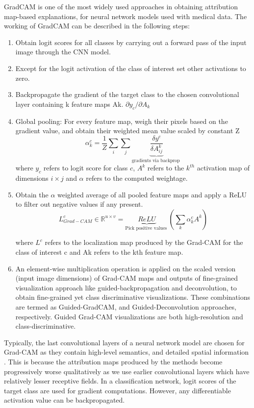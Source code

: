 \documentclass[../report.tex]{subfiles}
\begin{document}
GradCAM is one of the most widely used approaches in obtaining attribution map-based explanations, for neural network models used with medical data. The working of GradCAM can be described in the following steps:
\begin{enumerate}
	\item  Obtain logit scores for all classes by carrying out a forward pass of the input image through the CNN model.
	\item  Except for the logit activation of the class of interest set other activations to zero.
	\item Backpropagate the gradient of the target class to the chosen convolutional layer containing k feature maps Ak. $\partial y_c /\partial A_k$
	\item Global pooling: For every feature map, weigh their pixels based on the gradient value, and obtain their weighted mean value scaled by constant Z
	 \begin{equation*}
	 	\alpha_k^c={\frac{1}{Z} \sum_i \sum_j} \underbrace{\frac{\delta y^c}{\delta A_{i j}^k}}_{\text {gradients via backprop }}
	 \end{equation*}
	where $y_c$ refers to logit score for class $c$, $A^k$ refers to the $k^{th}$ activation map of dimensions $i \times j$ and $\alpha$ refers to the computed weightage.
	\item Obtain the $\alpha$ weighted average of all pooled feature maps and apply a ReLU to filter out negative values if any present.
	\begin{equation*}
		L_{G r a d-C A M}^c \in \mathbb{R}^{u \times v}=\underbrace{R e L U}_{\text {Pick positive values }}\left(\sum_k \alpha_k^c A^k\right)
	\end{equation*}
	
	where $L^c$ refers to the localization map produced by the Grad-CAM for the class of interest c and Ak refers to the kth feature map.
	\item An element-wise multiplication operation is applied on the scaled version (input image dimensions) of Grad-CAM maps and outputs of fine-grained visualization approach like guided-backpropagation and deconvolution, to obtain fine-grained yet class discriminative visualizations. These combinations are termed as Guided-GradCAM, and Guided-Deconvolution approaches, respectively. Guided Grad-CAM visualizations are both high-resolution and class-discriminative.
\end{enumerate}
	
	Typically, the last convolutional layers of a neural network model are chosen for Grad-CAM as they contain high-level semantics, and detailed spatial information \cite{selvaraju2017grad}. This is because the attribution maps produced by the methods become progressively worse qualitatively as we use earlier convolutional layers which have relatively lesser receptive fields. In a classification network, logit scores of the target class are used for gradient computations. However, any differentiable activation value can be backpropagated.
	 
\end{document}
